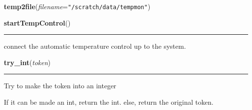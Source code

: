     \label{pydsp:temp2file}

    \vspace{0.5ex}

    \begin{boxedminipage}{\textwidth}

    \raggedright \textbf{temp2file}(\textit{filename}=\texttt{"/scratch/data/tempmon"})

    \end{boxedminipage}

    \label{pydsp:startTempControl}

    \vspace{0.5ex}

    \begin{boxedminipage}{\textwidth}

    \raggedright \textbf{startTempControl}()

    \vspace{-1.5ex}

    \rule{\textwidth}{0.5\fboxrule}
    connect the automatic temperature control up to the system.

    \vspace{1ex}

    \end{boxedminipage}

    \label{pydsp:try_int}

    \vspace{0.5ex}

    \begin{boxedminipage}{\textwidth}

    \raggedright \textbf{try\_int}(\textit{token})

    \vspace{-1.5ex}

    \rule{\textwidth}{0.5\fboxrule}
    Try to make the token into an integer

    If it can be made an int, return the int. else, return the original 
    token.

    \vspace{1ex}

    \end{boxedminipage}

    \label{pydsp:execcmd}

